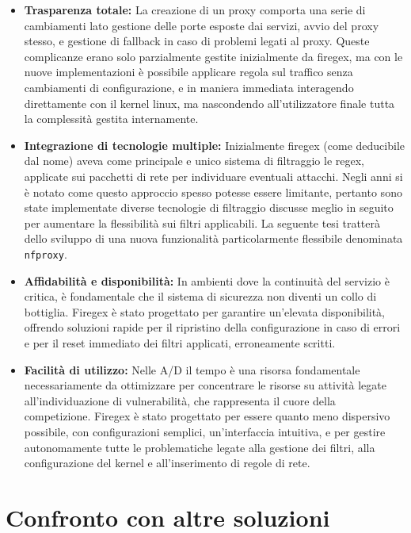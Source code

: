 \begin{itemize}
    \item \textbf{Trasparenza totale:} La creazione di un proxy comporta una serie di cambiamenti lato gestione delle porte esposte dai servizi, avvio del proxy stesso,
    e gestione di fallback in caso di problemi legati al proxy. Queste complicanze erano solo parzialmente gestite inizialmente da firegex, ma con le nuove implementazioni
    è possibile applicare regola sul traffico senza cambiamenti di configurazione, e in maniera immediata interagendo direttamente con il kernel linux, ma nascondendo
    all'utilizzatore finale tutta la complessità gestita internamente.
    \item \textbf{Integrazione di tecnologie multiple:} Inizialmente firegex (come deducibile dal nome) aveva come principale e unico sistema di filtraggio le regex,
    applicate sui pacchetti di rete per individuare eventuali attacchi. Negli anni si è notato come questo approccio spesso potesse essere limitante, pertanto sono state
    implementate diverse tecnologie di filtraggio discusse meglio in seguito per aumentare la flessibilità sui filtri applicabili. La seguente tesi tratterà dello sviluppo
    di una nuova funzionalità particolarmente flessibile denominata \texttt{nfproxy}.
    \item \textbf{Affidabilità e disponibilità:} In ambienti dove la continuità del servizio è critica, è fondamentale che il sistema di sicurezza non diventi un
    collo di bottiglia. Firegex è stato progettato per garantire un’elevata disponibilità, offrendo soluzioni rapide per il ripristino della configurazione in
    caso di errori e per il reset immediato dei filtri applicati, erroneamente scritti.
    \item \textbf{Facilità di utilizzo:} Nelle A/D il tempo è una risorsa fondamentale necessariamente da ottimizzare per concentrare le risorse su attività legate
    all'individuazione di vulnerabilità, che rappresenta il cuore della competizione. Firegex è stato progettato per essere quanto meno dispersivo possibile,
    con configurazioni semplici, un'interfaccia intuitiva, e per gestire autonomamente tutte le problematiche legate alla gestione dei filtri, alla configurazione
    del kernel e all'inserimento di regole di rete.
\end{itemize}

\section{Confronto con altre soluzioni}

